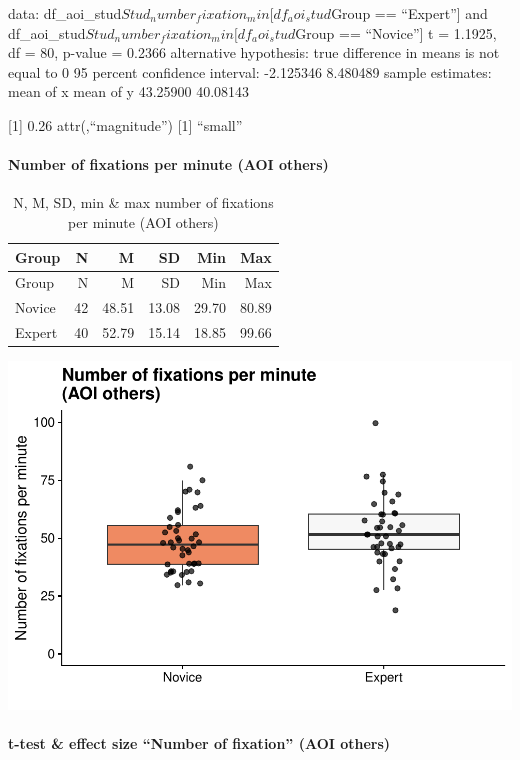 \documentclass[
]{article}
\begin{document}
data: df\_aoi\_stud\(Stud_number_fixation_min[df_aoi_stud\)Group ==
``Expert''{]} and
df\_aoi\_stud\(Stud_number_fixation_min[df_aoi_stud\)Group ==
``Novice''{]} t = 1.1925, df = 80, p-value = 0.2366 alternative
hypothesis: true difference in means is not equal to 0 95 percent
confidence interval: -2.125346 8.480489 sample estimates: mean of x mean
of y 43.25900 40.08143

{[}1{]} 0.26 attr(,``magnitude'') {[}1{]} ``small''

\paragraph{Number of fixations per minute (AOI
others)}\label{number-of-fixations-per-minute-aoi-others}

\begin{longtable}[]{@{}lrrrrr@{}}
\caption{N, M, SD, min \& max number of fixations per minute (AOI
others)}\tabularnewline
\toprule\noalign{}
Group & N & M & SD & Min & Max \\
\midrule\noalign{}
\endfirsthead
\toprule\noalign{}
Group & N & M & SD & Min & Max \\
\midrule\noalign{}
\endhead
\bottomrule\noalign{}
\endlastfoot
Novice & 42 & 48.51 & 13.08 & 29.70 & 80.89 \\
Expert & 40 & 52.79 & 15.14 & 18.85 & 99.66 \\
\end{longtable}

\includegraphics{expertise_2024_09_26_no_outlierdetection_MK_files/figure-latex/nof_others-1.pdf}

\paragraph{t-test \& effect size ``Number of fixation'' (AOI
others)}\label{t-test-effect-size-number-of-fixation-aoi-others}
\end{document}
